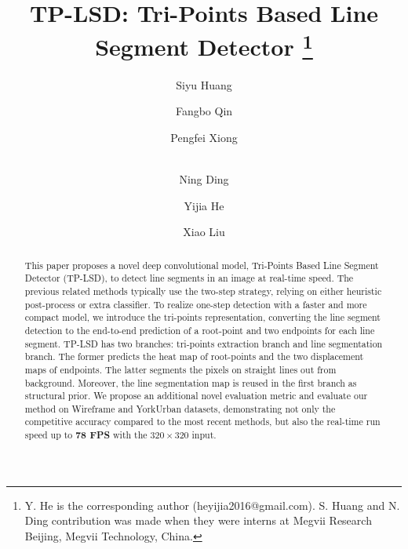 \documentclass[runningheads]{llncs}
\begin{document}
\pagestyle{headings}
\mainmatter
\def\ECCVSubNumber{5931}  

\title{TP-LSD: Tri-Points Based Line Segment Detector \thanks{Y. He is the corresponding author (heyijia2016@gmail.com). S. Huang and N. Ding contribution was made when they were interns at Megvii Research Beijing, Megvii Technology, China.}}

\begin{comment}
\titlerunning{ECCV-20 submission ID \ECCVSubNumber}
\authorrunning{ECCV-20 submission ID \ECCVSubNumber}
\author{Anonymous ECCV submission}
\institute{Paper ID \ECCVSubNumber}
\end{comment}


\author{Siyu Huang \and
Fangbo Qin \and
Pengfei Xiong \and \\
Ning Ding \and
Yijia He \and 
Xiao Liu}


\maketitle

\begin{abstract}
This paper proposes a novel deep convolutional model, Tri-Points Based Line Segment Detector (TP-LSD), to detect line segments in an image at real-time speed. The previous related methods typically use the two-step strategy, relying on either heuristic post-process or extra classifier. To realize one-step detection with a faster and more compact model, we introduce the tri-points representation, converting the line segment detection to the end-to-end prediction of a root-point and two endpoints for each line segment. TP-LSD has two branches: tri-points extraction branch and line segmentation branch. The former predicts the heat map of root-points and the two displacement maps of endpoints. The latter segments the pixels on straight lines out from background. Moreover, the line segmentation map is reused in the first branch as structural prior. We propose an additional novel evaluation metric and evaluate our method on Wireframe and YorkUrban datasets, demonstrating not only the competitive accuracy compared to the most recent methods, but also the real-time run speed up to \textbf{78 FPS} with the $320\times 320$ input.

\end{abstract}
\end{document}
